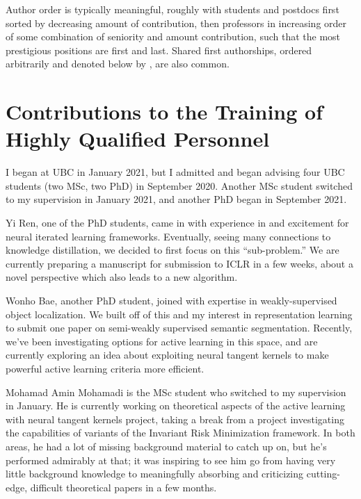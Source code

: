 \documentclass[12pt]{article}
\newcommand{\bibeqcon}{{\footnotemark[1]}}
\begin{document}
Author order is typically meaningful,
roughly with students and postdocs first sorted by decreasing amount of contribution,
then professors in increasing order of some combination of seniority and amount contribution,
such that the most prestigious positions are first and last.
Shared first authorships, ordered arbitrarily and denoted below by \bibeqcon{}, are also common.
{%

{%
\printbibliography[category=sec{{ loop.index }},title={ {{- sec_name -}} },heading=subbibnumbered]{}
{%

{%

\section{Contributions to the Training of Highly Qualified Personnel}

I began at UBC in January 2021, but I admitted and began advising four UBC students (two MSc, two PhD) in September 2020. Another MSc student switched to my supervision in January 2021, and another PhD began in September 2021.

Yi Ren, one of the PhD students, came in with experience in and excitement for neural iterated learning frameworks. Eventually, seeing many connections to knowledge distillation, we decided to first focus on this ``sub-problem.'' We are currently preparing a manuscript for submission to ICLR in a few weeks, about a novel perspective which also leads to a new algorithm.

Wonho Bae, another PhD student, joined with expertise in weakly-supervised object localization. We built off of this and my interest in representation learning to submit one paper on semi-weakly supervised semantic segmentation. Recently, we've been investigating options for active learning in this space, and are currently exploring an idea about exploiting neural tangent kernels to make powerful active learning criteria more efficient.

Mohamad Amin Mohamadi is the MSc student who switched to my supervision in January. He is currently working on theoretical aspects of the active learning with neural tangent kernels project, taking a break from a project investigating the capabilities of variants of the Invariant Risk Minimization framework. In both areas, he had a lot of missing background material to catch up on, but he's performed admirably at that; it was inspiring to see him go from having very little background knowledge to meaningfully absorbing and criticizing cutting-edge, difficult theoretical papers in a few months.

}}}}
\end{document}
